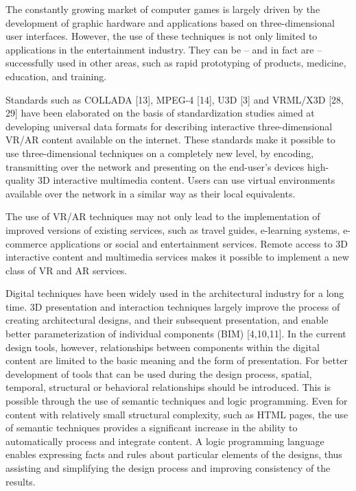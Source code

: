 \documentclass[runningheads]{llncs}
\begin{document}
The constantly growing market of computer games is largely driven by the development of graphic hardware and applications based on three-dimensional user interfaces. However, the use of these techniques is not only limited to applications in the entertainment industry. They can be -- and in fact are -- successfully used in other areas, such as rapid prototyping of products, medicine, education, and training. 

Standards such as COLLADA [13], MPEG-4 [14], U3D [3] and VRML/X3D [28, 29] have been elaborated on the basis of standardization studies aimed at developing universal data formats for describing interactive three-dimensional VR/AR content available on the internet. These standards make it possible to use three-dimensional techniques on a completely new level, by encoding, transmitting over the network and presenting on the end-user's devices high-quality 3D interactive multimedia content. Users can use virtual environments available over the network in a similar way as their local equivalents.

The use of VR/AR techniques may not only lead to the implementation of improved versions of existing services, such as travel guides, e-learning systems, e-commerce applications or social and entertainment services. Remote access to 3D interactive content and multimedia services makes it possible to implement a new class of VR and AR services.

Digital techniques have been widely used in the architectural industry for a long time. 3D presentation and interaction techniques largely improve the process of creating architectural designs, and their subsequent presentation, and enable better parameterization of individual components (BIM) [4,10,11].  In the current design tools, however, relationships between components within the digital content are limited to the basic meaning and the form of  presentation. For better development of tools that can be used during the design process, spatial, temporal, structural or behavioral relationships should be introduced. This is possible through the use of semantic techniques and logic programming. Even for content with relatively small structural complexity, such as HTML pages, the use of semantic techniques provides a significant increase in the ability to automatically process and integrate content. A logic programming language enables expressing facts and rules about particular elements of the designs, thus assisting and simplifying the design process and improving consistency of the results. 
\end{document}
